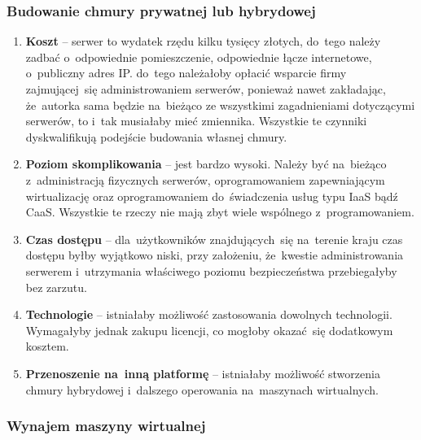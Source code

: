 \documentclass[12pt,a4paper,twoside,titlepage,openright]{book}
\begin{document}
\subsubsection{Budowanie chmury prywatnej lub hybrydowej}

\begin{enumerate}
	\item \textbf{Koszt} -- serwer to wydatek rzędu kilku tysięcy złotych, do~tego należy zadbać o~odpowiednie pomieszczenie, odpowiednie łącze internetowe, o~publiczny adres IP. do~tego należałoby opłacić wsparcie firmy zajmującej~się administrowaniem serwerów, ponieważ nawet zakładając, że~autorka sama będzie na~bieżąco ze wszystkimi zagadnieniami dotyczącymi serwerów, to i~tak musiałaby mieć zmiennika. Wszystkie te czynniki dyskwalifikują podejście budowania własnej chmury. 
	\item \textbf{Poziom skomplikowania} -- jest bardzo wysoki. Należy być na~bieżąco z~administracją fizycznych serwerów, oprogramowaniem zapewniającym wirtualizację oraz oprogramowaniem do~świadczenia usług typu IaaS bądź CaaS. Wszystkie te rzeczy nie mają zbyt wiele wspólnego z~programowaniem.
	\item \textbf{Czas dostępu} -- dla~użytkowników znajdujących~się na~terenie kraju czas dostępu byłby wyjątkowo niski, przy założeniu, że~kwestie administrowania serwerem i~utrzymania właściwego poziomu bezpieczeństwa przebiegałyby bez zarzutu.
	\item \textbf{Technologie} -- istniałaby możliwość zastosowania dowolnych technologii. Wymagałyby jednak zakupu licencji, co mogłoby okazać~się dodatkowym kosztem.
	\item \textbf{Przenoszenie na~inną platformę} -- istniałaby możliwość stworzenia chmury hybrydowej i~dalszego operowania na~maszynach wirtualnych.
\end{enumerate}


\subsubsection{Wynajem maszyny wirtualnej}
\end{document}
